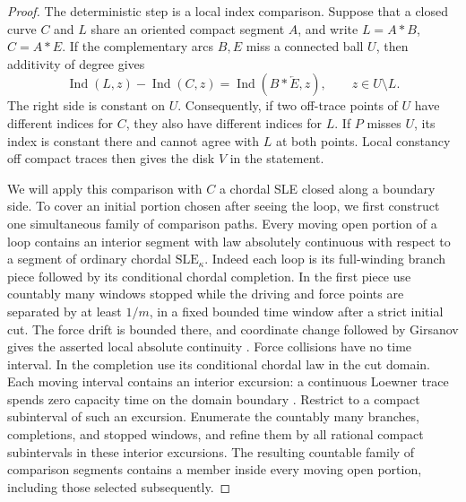\begin{proof}
The deterministic step is a local index comparison.  Suppose that a
closed curve $C$ and $L$ share an oriented compact segment $A$, and
write $L=A*B$, $C=A*E$.  If the complementary arcs $B,E$ miss a
connected ball $U$, then additivity of degree gives
\begin{equation}\label{loop:index-difference}
 \operatorname{Ind}(L,z)-\operatorname{Ind}(C,z)
   =\operatorname{Ind}(B*\overleftarrow E,z),
 \qquad z\in U\setminus L.
\end{equation}
The right side is constant on $U$.  Consequently, if two off-trace
points of $U$ have different indices for $C$, they also have different
indices for $L$.  If $P$ misses $U$, its index is constant there and
cannot agree with $L$ at both points.  Local constancy off compact
traces then gives the disk $V$ in the statement.

We will apply this comparison with $C$ a chordal SLE closed along a
boundary side.  To cover an initial portion chosen after seeing the
loop, we first construct one simultaneous family of comparison paths.
Every moving open portion of a loop contains an interior segment with
law absolutely continuous with respect to a segment of ordinary
chordal $\mathrm{SLE}_{\kappa}$.  Indeed each loop is its full-winding
branch piece followed by its conditional chordal completion.  In the
first piece use countably many windows stopped while the driving and
force points are separated by at least $1/m$, in a fixed bounded time
window after a strict initial cut.  The force drift is bounded there,
and coordinate change followed by Girsanov gives the asserted local
absolute continuity \cite[Theorem~3 and Section~5]
{SchrammWilsonCoordinateChanges}.  Force collisions have no time
interval.  In the completion use its conditional chordal law in the
cut domain.  Each moving interval contains an interior excursion:
a continuous Loewner trace spends zero capacity time on the domain
boundary \cite[Proposition~1.7]{YuanLoewnerTraces}.  Restrict to a
compact subinterval of such an excursion.  Enumerate the countably many
branches, completions, and stopped windows, and refine them by all
rational compact subintervals in these interior excursions.  The
resulting countable family of comparison segments contains a member
inside every moving open portion, including those selected subsequently.


\end{proof}
